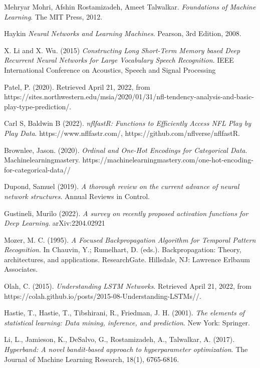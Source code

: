 \documentclass[11pt]{article}
\begin{document}
\begin{thebibliography}{999}

        Mehryar Mohri, Afshin Rostamizadeh, Ameet Talwalkar.
      \emph{Foundations of Machine Learning}.
      The MIT Press,
      2012.
      
      Haykin
    \emph{Neural Networks and Learning Machines}.
    Pearson, 3rd Edition,
    2008.

    X. Li and X. Wu. (2015)
    \emph{Constructing Long Short-Term Memory based Deep Recurrent Neural Networks for Large Vocabulary Speech Recognition}.
    IEEE International Conference on Acoustics, Speech and Signal Processing

    Patel, P. (2020). Retrieved April 21, 2022, from https://sites.northwestern.edu/msia/2020/01/31/nfl-tendency-analysis-and-basic-play-type-prediction/. 

    Carl S, Baldwin B (2022). \emph{nflfastR: Functions to Efficiently Access NFL Play by Play Data}. https://www.nflfastr.com/, https://github.com/nflverse/nflfastR.

    Brownlee, Jason. (2020). \emph{Ordinal and One-Hot Encodings for Categorical Data}. Machinelearningmastery. https://machinelearningmastery.com/one-hot-encoding-for-categorical-data//
    
    Dupond, Samuel (2019). \emph{A thorough review on the current advance of neural network structures}. Annual Reviews in Control.

    Gustineli, Murilo (2022). \emph{A survey on recently proposed activation functions for Deep Learning}. arXiv:2204.02921

    Mozer, M. C. (1995). \emph{A Focused Backpropagation Algorithm for Temporal Pattern Recognition}. In Chauvin, Y.; Rumelhart, D. (eds.). Backpropagation: Theory, architectures, and applications. ResearchGate. Hillsdale, NJ: Lawrence Erlbaum Associates.

    Olah, C. (2015). \emph{Understanding LSTM Networks}. Retrieved April 21, 2022, from https://colah.github.io/posts/2015-08-Understanding-LSTMs//.
    
    Hastie, T., Hastie, T., Tibshirani, R., Friedman, J. H. (2001). \emph{The elements of statistical learning: Data mining, inference, and prediction}. New York: Springer.

    Li, L., Jamieson, K., DeSalvo, G., Rostamizadeh, A., Talwalkar, A. (2017). \emph{Hyperband: A novel bandit-based approach to hyperparameter optimization}. The Journal of Machine Learning Research, 18(1), 6765-6816.
    
\end{thebibliography}
\end{document}

